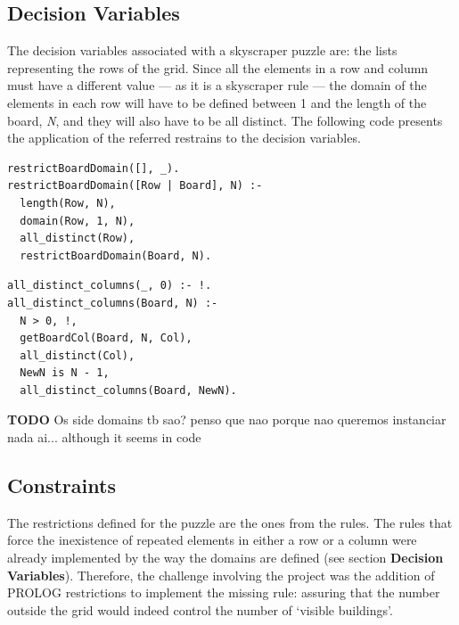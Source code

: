 \documentclass{llncs}
\begin{document}
%
\subsection{Decision Variables}

The decision variables associated with a skyscraper puzzle are: the lists representing the rows of the grid. Since all the elements in a row and column must have a different value --- as it is a skyscraper rule --- the domain of the elements in each row will have to be defined between 1 and the length of the board, \textit{N}, and they will also have to be all distinct. The following code presents the application of the referred restrains to the decision variables.\\

\noindent\begin{minipage}{.44\textwidth}
\begin{lstlisting}[frame= tblr, caption=Row domain restrictions]
restrictBoardDomain([], _).
restrictBoardDomain([Row | Board], N) :-
  length(Row, N),
  domain(Row, 1, N),
  all_distinct(Row),
  restrictBoardDomain(Board, N).
\end{lstlisting}
\end{minipage}\hfill
\begin{minipage}{.5\textwidth}
\begin{lstlisting}[frame=tblr, caption=Column all elements distinct]
all_distinct_columns(_, 0) :- !.
all_distinct_columns(Board, N) :-
  N > 0, !,
  getBoardCol(Board, N, Col),
  all_distinct(Col),
  NewN is N - 1,
  all_distinct_columns(Board, NewN).
\end{lstlisting}
\end{minipage}\hfill

\textbf{TODO} Os side domains tb sao? penso que nao porque nao queremos instanciar nada ai... although it seems in code

%
\subsection{Constraints}

The restrictions defined for the puzzle are the ones from the rules. The rules that force the inexistence of repeated elements in either a row or a column were already implemented by the way the domains are defined (see section \textbf{Decision Variables}). Therefore, the challenge involving the project was the addition of PROLOG restrictions to implement the missing rule: assuring that the number outside the grid would indeed control the number of `visible buildings'.\\
\end{document}
